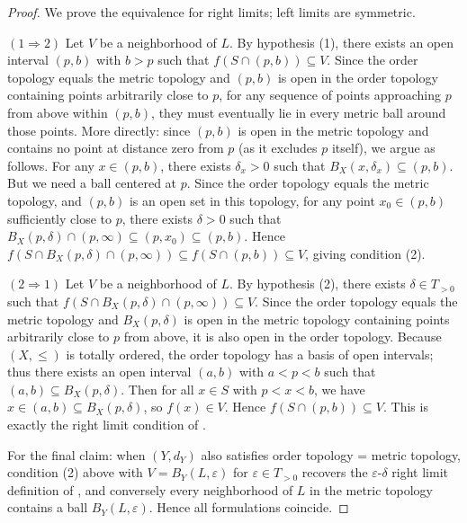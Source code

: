 \begin{proof}
    We prove the equivalence for right limits; left limits are symmetric.

    $(1 \Rightarrow 2)$ Let $V$ be a neighborhood of $L$. By hypothesis (1), there exists an open interval $(p, b)$ with $b > p$ such that $f(S \cap (p, b)) \subseteq V$. Since the order topology equals the metric topology and $(p, b)$ is open in the order topology containing points arbitrarily close to $p$, for any sequence of points approaching $p$ from above within $(p, b)$, they must eventually lie in every metric ball around those points. More directly: since $(p, b)$ is open in the metric topology and contains no point at distance zero from $p$ (as it excludes $p$ itself), we argue as follows. For any $x \in (p, b)$, there exists $\delta_x > 0$ such that $B_X(x, \delta_x) \subseteq (p, b)$. But we need a ball centered at $p$. Since the order topology equals the metric topology, and $(p, b)$ is an open set in this topology, for any point $x_0 \in (p, b)$ sufficiently close to $p$, there exists $\delta > 0$ such that $B_X(p, \delta) \cap (p, \infty) \subseteq (p, x_0) \subseteq (p, b)$. Hence $f(S \cap B_X(p, \delta) \cap (p, \infty)) \subseteq f(S \cap (p, b)) \subseteq V$, giving condition (2).

    $(2 \Rightarrow 1)$ Let $V$ be a neighborhood of $L$. By hypothesis (2), there exists $\delta \in T_{>0}$ such that $f(S \cap B_X(p, \delta) \cap (p, \infty)) \subseteq V$. Since the order topology equals the metric topology and $B_X(p, \delta)$ is open in the metric topology containing points arbitrarily close to $p$ from above, it is also open in the order topology. Because $(X, \leq)$ is totally ordered, the order topology has a basis of open intervals; thus there exists an open interval $(a, b)$ with $a < p < b$ such that $(a, b) \subseteq B_X(p, \delta)$. Then for all $x \in S$ with $p < x < b$, we have $x \in (a, b) \subseteq B_X(p, \delta)$, so $f(x) \in V$. Hence $f(S \cap (p, b)) \subseteq V$. This is exactly the right limit condition of .

    For the final claim: when $(Y, d_Y)$ also satisfies order topology = metric topology, condition (2) above with $V = B_Y(L, \varepsilon)$ for $\varepsilon \in T_{>0}$ recovers the $\varepsilon$-$\delta$ right limit definition of , and conversely every neighborhood of $L$ in the metric topology contains a ball $B_Y(L, \varepsilon)$. Hence all formulations coincide.
\end{proof}
